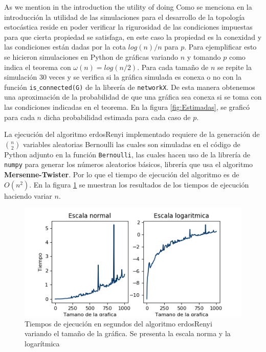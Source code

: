 As we mention in the introduction the utility of doing Como se menciona en la introducción la utilidad de las simulaciones para el desarrollo de la topología estocástica reside en poder verificar la rigurosidad de las condiciones impuestas para que cierta propiedad se satisfaga, en este caso la propiedad es la conexidad y las condiciones están dadas por la cota $log(n)/n$ para $p$. Para ejemplificar esto se hicieron simulaciones en Python de gráficas variando $n$ y tomando $p$ como indica el teorema con $\omega(n)= log(n/2)$. Para cada tamaño de $n$ se repite la simulación 30 veces y se verifica si la gráfica simulada es conexa o no con la función \texttt{is$\_$connected(G)} de la librería de \texttt{networkX}. De esta manera obtenemos una aproximación de la probabilidad de que una gráfica sea conexa si se toma con las condiciones indicadas en el teorema. En la figura \ref{fig:Estimadas}, se graficó para cada $n$ dicha probabilidad estimada para cada caso de $p$.

La ejecución del algoritmo erdosRenyi implementado requiere de la generación de $\binom{n}{2}$ variables aleatorias Bernoulli las cuales son simuladas en el código de Python adjunto en la función \texttt{Bernoulli}, las cuales hacen uso de la librería de \texttt{numpy} para generar los números aleatorios básicos, librería que usa el algoritmo \textbf{Mersenne-Twister}. Por lo que el tiempo de ejecución del algoritmo es de $O(n^{2})$. En la figura \ref{fig:tiemposER} se muestran los resultados de los tiempos de ejecución haciendo variar $n$.

\begin{figure}[h!]
	\centering
	\includegraphics[scale=0.8]{Python/Figures/Times-ER.png}
	\caption{Tiempos de ejecución en segundos del algoritmo erdosRenyi variando el tamaño de la gráfica. Se presenta la escala norma y la logarítmica}
	\label{fig:tiemposER}
\end{figure}



